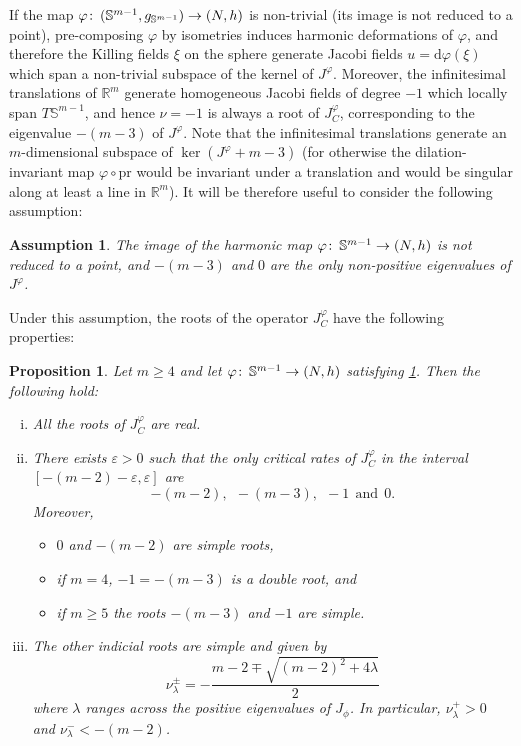 \documentclass{article}
\numberwithin{equation}{section}        %
\theoremstyle{bfnote}
\newtheorem{prop}[thm]{Proposition}         %
\newtheorem{hyp}[thm]{Assumption}           %
\theoremstyle{definition}
\theoremstyle{bfremark}
\newcommand{\col}{\colon \thinspace}        %
\newcommand{\R}{\mathbb{R}}                 %
\newcommand{\Sp}{\mathbb{S}}                %
\newcommand{\pr}{\mathrm{pr}}               %
\newcommand{\diff}{\mathrm{d}}                      %
\begin{document}
If the map $\varphi \col (\Sp^{m-1},g_{\Sp^{m-1}}) \rightarrow (N,h)$ is non-trivial (its image is not reduced to a point), pre-composing $\varphi$ by isometries induces harmonic deformations of $\varphi$, and therefore the Killing fields $\xi$ on the sphere generate Jacobi fields $u = \diff \varphi(\xi)$ which span a non-trivial subspace of the kernel of $J^\varphi$. Moreover, the infinitesimal translations of $\R^m$ generate homogeneous Jacobi fields of degree $-1$ which locally span $T\Sp^{m-1}$, and hence $\nu = -1$ is always a root of $J^\varphi_C$, corresponding to the eigenvalue $-(m-3)$ of $J^\varphi$. Note that the infinitesimal translations generate an $m$-dimensional subspace of $\ker(J^\varphi + m-3)$ \cite{elsoufi1995indice} (for otherwise the dilation-invariant map $\varphi \circ \pr$ would be invariant under a translation and would be singular along at least a line in $\R^m$). It will be therefore useful to consider the following assumption:

\begin{hyp}     \label{assumption: Eigenvalues of varphi}
    The image of the harmonic map $\varphi \col \Sp^{m-1} \rightarrow (N,h)$ is not reduced to a point, and $-(m-3)$ and $0$ are the only non-positive eigenvalues of $J^\varphi$.
\end{hyp}

Under this assumption, the roots of the operator $J^\varphi_C$ have the following properties:

\begin{prop}    \label{prop: indicial roots of model operator}
    Let $m \geq 4$ and let $\varphi \col \Sp^{m-1} \rightarrow (N,h)$ satisfying \cref{assumption: Eigenvalues of varphi}. Then the following hold:
	\begin{enumerate}[(i)]
        \item All the roots of $J^\varphi_C$ are real.
        
		\item There exists $\varepsilon > 0$ such that the only critical rates of $J^\varphi_C$ in the interval $[-(m-2)-\varepsilon,\varepsilon]$ are
		\begin{equation*}
			-(m-2), ~~ -(m-3), ~~ -1 ~~ \text{and} ~~ 0 .
		\end{equation*}
		Moreover,
        \begin{itemize}
            \item $0$ and $-(m-2)$ are simple roots,
            \item if $m = 4$, $-1 = -(m-3)$ is a double root, and 
            \item if $m \geq 5$ the roots $-(m-3)$ and $-1$ are simple.
        \end{itemize}
        
		\item The other indicial roots are simple and given by 
		\begin{equation*}
			\nu_{\lambda}^\pm = - \frac{m-2 \mp \sqrt{(m-2)^2+4\lambda}}{2}
		\end{equation*}
		where $\lambda$ ranges across the positive eigenvalues of $J_\phi$. In particular, $\nu_\lambda^+ > 0$ and $\nu^-_\lambda < -(m-2)$.
	\end{enumerate}
\end{prop}
\end{document}
